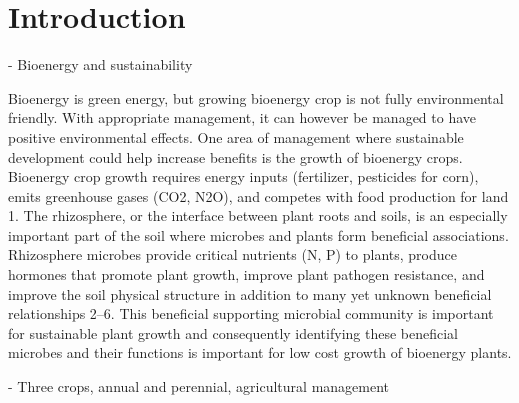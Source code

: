 \documentclass[12pt]{article}
\begin{document}
\maketitle
\section{Introduction}

- Bioenergy and sustainability

Bioenergy is green energy, but growing bioenergy crop is not fully environmental friendly. With appropriate management, it can however be managed to have positive environmental effects. One area of management where sustainable development could help increase benefits is the growth of bioenergy crops. Bioenergy crop growth requires energy inputs (fertilizer, pesticides for corn), emits greenhouse gases (CO2, N2O), and competes with food production for land 1. The rhizosphere, or the interface between plant roots and soils, is an especially important part of the soil where microbes and plants form beneficial associations. Rhizosphere microbes provide critical nutrients (N, P) to plants, produce hormones that promote plant growth, improve plant pathogen resistance, and improve the soil physical structure in addition to many yet unknown beneficial relationships 2–6. This beneficial supporting microbial community is important for sustainable plant growth and consequently identifying these beneficial microbes and their functions is important for low cost growth of bioenergy plants.

- Three crops, annual and perennial, agricultural management
\end{document}
